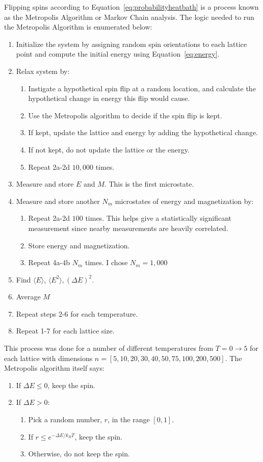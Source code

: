\documentclass[12pt]{article}
\begin{document}
Flipping spins according to Equation~\ref{eq:probabilityheatbath} is a process known as the Metropolis Algorithm or Markov Chain analysis. The logic needed to run the Metropolis Algorithm is enumerated below:
\begin{enumerate}
  \item Initialize the system by assigning random spin orientations to each lattice point and compute the initial energy using Equation~\ref{eq:energy}.
  \item Relax system by:
  \begin{enumerate}
    \item Instigate a hypothetical spin flip at a random location, and calculate the hypothetical change in energy this flip would cause.
    \item Use the Metropolis algorithm to decide if the spin flip is kept.
    \item If kept, update the lattice and energy by adding the hypothetical change.
    \item If not kept, do not update the lattice or the energy.
    \item Repeat 2a-2d $10,000$ times.
  \end{enumerate}
  \item Measure and store $E$ and $M$. This is the first microstate.
  \item Measure and store another $N_m$ microstates of energy and magnetization by:
  \begin{enumerate}
    \item Repeat 2a-2d $100$ times. This helps give a statistically significant measurement since nearby measurements are heavily correlated.
    \item Store energy and magnetization.
    \item Repeat 4a-4b $N_m$ times. I chose $N_m=1,000$
  \end{enumerate}
  \item  Find $\langle E \rangle$, $\langle E^2\rangle, \left(\Delta E\right)^2$.
  \item Average $M$
  \item Repeat steps 2-6 for each temperature.
  \item Repeat 1-7 for each lattice size.
\end{enumerate}
This process was done for a number of different temperatures from $T=0\to 5$ for each lattice with dimensions $n = [5,10,20,30,40,50,75,100,200,500]$. The Metropolis algorithm itself says:
\begin{enumerate}
  \item If $\Delta E \leq 0$, keep the spin.
  \item If $\Delta E > 0$:
  \begin{enumerate}
    \item Pick a random number, $r$, in the range $[0,1]$.
    \item If $r \leq e^{-\Delta E/k_B T}$, keep the spin.
    \item Otherwise, do not keep the spin.
  \end{enumerate}
\end{enumerate}
\end{document}
